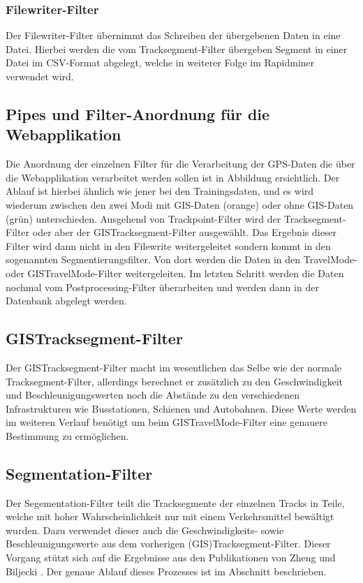 \subsubsection{Filewriter-Filter}
Der Filewriter-Filter übernimmt das Schreiben der übergebenen Daten in eine Datei. Hierbei werden die vom Tracksegment-Filter übergeben Segment in einer Datei im CSV-Format abgelegt, welche in weiterer Folge im Rapidminer verwendet wird.

\subsection{Pipes und Filter-Anordnung für die Webapplikation}
Die Anordnung der einzelnen Filter für die Verarbeitung der GPS-Daten die über die Webapplikation verarbeitet werden sollen ist in Abbildung  ersichtlich. Der Ablauf ist hierbei ähnlich wie jener bei den Trainingsdaten, und es wird wiederum zwischen den zwei Modi mit GIS-Daten (orange) oder ohne GIS-Daten (grün) unterschieden. Ausgehend von Trackpoint-Filter wird der Tracksegment-Filter oder aber der GISTracksegment-Filter ausgewählt. Das Ergebnis dieser Filter wird dann nicht in den Filewrite weitergeleitet sondern kommt in den sogenannten Segmentierungsfilter. Von dort werden die Daten in den  TravelMode- oder GISTravelMode-Filter weitergeleiten. Im letzten Schritt werden die Daten nochmal vom Postprocessing-Filter überarbeiten und werden dann in der Datenbank abgelegt werden. 


\clearpage
\subsection{GISTracksegment-Filter}
Der GISTracksegment-Filter macht im wesentlichen das Selbe wie der normale Tracksegment-Filter, allerdings berechnet er zusätzlich zu den Geschwindigkeit und Beschleunigungswerten noch die Abstände zu den verschiedenen Infrastrukturen wie Busstationen, Schienen und Autobahnen. Diese Werte werden im weiteren Verlauf benötigt um beim GISTravelMode-Filter eine genauere Bestimmung zu ermöglichen.

\subsection{Segmentation-Filter}
Der Segementation-Filter teilt die Tracksegmente der einzelnen Tracks in Teile, welche mit hoher Wahrscheinlichkeit nur mit einem Verkehrsmittel bewältigt wurden. Dazu verwendet dieser auch die Geschwindigkeits- sowie Beschleunigungswerte aus dem vorherigen (GIS)Tracksegment-Filter. Dieser Vorgang stützt sich auf die Ergebnisse aus den Publikationen von Zheng \cite{zheng_understanding_2010} und Biljecki \cite{biljecki_transportation_2013}. Der genaue Ablauf dieses Prozesses ist im Abschnitt  beschrieben.

